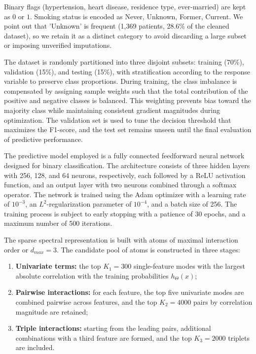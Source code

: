 \documentclass[letterpaper,11pt]{article}
\numberwithin{equation}{section}
\numberwithin{equation}{section}
\begin{document}
Binary flags (hypertension, heart disease, residence type, ever-married) are kept as $0$ or $1$. Smoking status is encoded as Never, Unknown, Former, Current. We point out that 'Unknown' is frequent (1,369 patients, 28.6\% of the cleaned dataset), so we retain it as a distinct category to avoid discarding a large subset or imposing unverified imputations.

The dataset is randomly partitioned into three disjoint subsets: training (70\%), validation (15\%), and testing (15\%), with stratification according to the response variable to preserve class proportions. During training, the class imbalance is compensated by assigning sample weights such that the total contribution of the positive and negative classes is balanced. This weighting prevents bias toward the majority class while maintaining consistent gradient magnitudes during optimization. The validation set is used to tune the decision threshold that maximizes the F1-score, and the test set remains unseen until the final evaluation of predictive performance.

The predictive model employed is a fully connected feedforward neural network designed for binary classification. The architecture consists of three hidden layers with 256, 128, and 64 neurons, respectively, each followed by a ReLU activation function, and an output layer with two neurons combined through a softmax operator. The network is trained using the Adam optimizer with a learning rate of $10^{-3}$, an $L^2$-regularization parameter of $10^{-4}$, and a batch size of 256. The training process is subject to early stopping with a patience of 30 epochs, and a maximum number of 500 iterations.



The sparse spectral representation is built with atoms of maximal interaction order or $d_{max}=3$. The candidate pool of atoms is constructed in three stages:
\begin{enumerate}
    \item {\bf Univariate terms:} the top $K_1=300$ single-feature modes with the largest absolute correlation with the training probabilities $h_\Theta(x)$;
    \item {\bf Pairwise interactions:} for each feature, the top five univariate modes are combined pairwise across features, and the top $K_2=4000$ pairs by correlation magnitude are retained;
    \item {\bf Triple interactions:} starting from the leading pairs, additional combinations with a third feature are formed, and the top $K_3=2000$ triplets are included. 
\end{enumerate}
\end{document}
